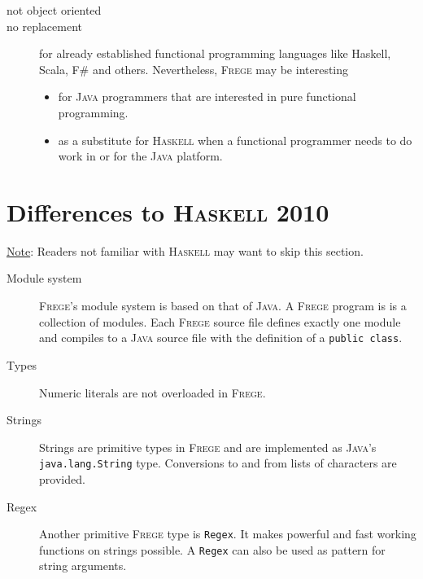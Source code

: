 \documentclass[letterpaper,12pt]{report}
\newcommand{\boxquote}[3]{
\begin{center}
\colorbox{#1}%
{\parbox{0.9\textwidth}{
\sf
\underline{#2}:
#3
}}
\end{center}}
\newcommand{\note}[1]{\boxquote{grau}{Note}{#1}}
\newcommand{\haskell}[0]{\textsc{Haskell}}
\newcommand{\frege}[0]{\textsc{Frege}}
\newcommand{\java}[0]{\textsc{Java}}
\begin{document}
\begin{description}

\item[not object oriented]

\item[no replacement]

for already established functional programming languages like Haskell,
Scala, F\# and others.
Nevertheless, \frege{} may be interesting
\begin{itemize}
\item for \java{} programmers that are interested in pure functional programming. 
\item as a substitute for \haskell{} when a functional programmer needs to do work in or for the \java{} platform. 
\end{itemize}

\end{description}

\section{Differences to \haskell{} 2010}

\note{Readers not familiar with \haskell{} may want to skip this
section.}

\begin{description}
\item[Module system]
\frege{}'s module system is based on that of \java{}. A \frege{}
program is is a collection of modules. Each \frege{}
source file defines exactly one module
and compiles to a \java{} source file with the definition of a
\texttt{public class}.


\item[Types]

Numeric literals are not overloaded in \frege{}. 

\item[Strings]
Strings are primitive types in \frege{} and are implemented
as \java{}'s \texttt{java.lang.String} type.
Conversions to and
from lists of characters are provided.

\item[Regex]
\par Another primitive \frege{} type is \texttt{Regex}. It makes
powerful
and fast working functions on strings possible. A \texttt{Regex} can
also
be used as pattern for string arguments.

\end{description}
\end{document}
